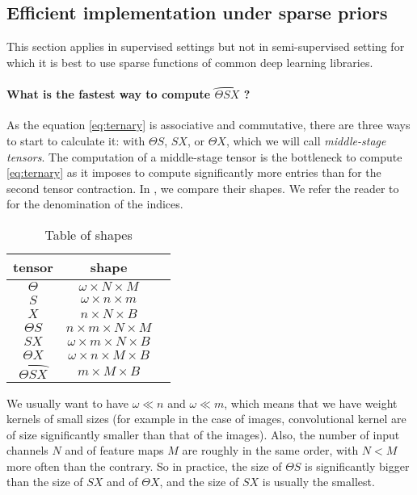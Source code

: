 \subsection{Efficient implementation under sparse priors}

\begin{remark}
This section applies in supervised settings but not in semi-supervised setting for which it is best to use sparse functions of common deep learning libraries.
\end{remark}

\paragraph{What is the fastest way to compute $\wideparen{\Theta S X}$ ?}
As the equation \eqref{eq:ternary} is associative and commutative, there are three ways to start to calculate it: with $\Theta S$, $SX$, or $\Theta X$, which we will call \emph{middle-stage tensors}. The computation of a middle-stage tensor is the bottleneck to compute \eqref{eq:ternary} as it imposes to compute significantly more entries than for the second tensor contraction. In , we compare their shapes. We refer the reader to  for the denomination of the indices.

\begin{table}[H]
  \centering
\begin{tabular}{ccc}
  tensor & shape\\
  \hline
  $\Theta$ & $\omega \times N \times M$\\
  $S$ & $\omega \times n \times m$\\
  $X$ & $n \times N \times B$\\
  $\Theta S$ & $n \times m \times N \times M$\\
  $SX$ & $\omega \times m \times N \times B$\\
  $\Theta X$ & $\omega \times n \times M \times B$\\
  $\wideparen{\Theta SX}$ & $m \times M \times B$
\end{tabular}
\caption{Table of shapes}
\label{tab:mid}
\end{table}

We usually want to have $\omega \ll n$ and $\omega \ll m$, which means that we have weight kernels of small sizes (for example in the case of images, convolutional kernel are of size significantly smaller than that of the images). Also, the number of input channels $N$ and of feature maps $M$ are roughly in the same order, with $N < M$ more often than the contrary. So in practice, the size of $\Theta S$ is significantly bigger than the size of $SX$ and of $\Theta X$, and the size of $SX$ is usually the smallest.

